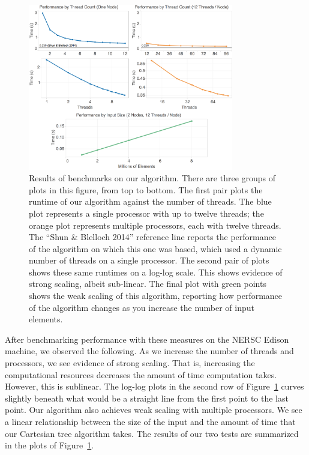\documentclass[10pt]{article}
\begin{document}
\begin{figure}[t]
\centering
\includegraphics[width=0.8\textwidth]{figures/benchmarks}
\caption{%
Results of benchmarks on our algorithm.
There are three groups of plots in this figure, from top to bottom.
The first pair plots the runtime of our algorithm against the number of threads.
The blue plot represents a single processor with up to twelve threads;
the orange plot represents multiple processors, each with twelve threads.
The ``Shun \& Blelloch 2014'' reference line reports the performance of the algorithm on which
this one was based, which used a dynamic number of threads on a single processor.
The second pair of plots shows these same runtimes on a log-log scale.
This shows evidence of strong scaling, albeit sub-linear.
The final plot with green points shows the weak scaling of this algorithm, reporting how
performance of the algorithm changes as you increase the number of input elements.
}
\label{fig:benchmarks}
\end{figure}

After benchmarking performance with these measures on the NERSC Edison machine,
we observed the following.
As we increase the number of threads and processors, we see evidence of strong scaling.
That is, increasing the computational resources decreases the amount of time computation takes.
However, this is sublinear.
The log-log plots in the second row of Figure~\ref{fig:benchmarks} curves slightly beneath what
would be a straight line from the first point to the last point.
Our algorithm also achieves weak scaling with multiple processors.
We see a linear relationship between the size of the input and the amount of time that our
Cartesian tree algorithm takes.
The results of our two tests are summarized in the plots of Figure~\ref{fig:benchmarks}.
\end{document}
